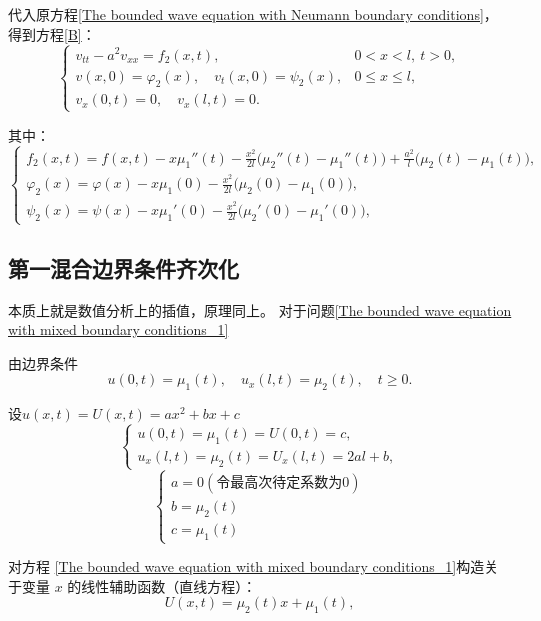 \documentclass[12pt,a4paper]{article}
\numberwithin{subsection}{section}
\numberwithin{subsubsection}{subsection}
\theoremstyle{plain}
\theoremstyle{definition}
\theoremstyle{remark}
\begin{document}
		代入原方程\eqref{The bounded wave equation with Neumann boundary conditions}，
		得到方程\eqref{B}：
	    \begin{equation}\label{B}
		\begin{cases}
			v_{tt} - a^2 v_{xx} = f_2(x, t), & 0 < x < l, \ t > 0, \\
			v(x, 0) = \varphi_2(x), \quad v_t(x, 0) = \psi_2(x), & 0 \leq x \leq l, \\
			v_x(0, t) = 0, \quad v_x(l, t) = 0. &
		\end{cases}
	\end{equation}

其中：
		\begin{equation}
			\begin{cases}
				f_2(x, t) = f(x, t)-x\mu_1''(t) - \frac{x^2}{2l}\big( \mu_2''(t) - \mu_1''(t) \big) + \frac{a^2}{l}\big( \mu_2(t) - \mu_1(t) \big), \\
				\varphi_2(x) = \varphi(x) - x\mu_1(0) - \frac{x^2}{2l}\big( \mu_2(0) - \mu_1(0) \big), \\
			\psi_2(x) = \psi(x) - x\mu_1'(0) - \frac{x^2}{2l}\big( \mu_2'(0) - \mu_1'(0) \big), 
			\end{cases}
		\end{equation}
		
	
		
	\subsection{第一混合边界条件齐次化}
	本质上就是数值分析上的插值，原理同上。
	对于问题\eqref{The bounded wave equation with mixed boundary conditions_1}
	
		由边界条件
	\begin{equation}
		u(0,t) = \mu_1(t), \quad u_x(l,t) = \mu_2(t), \quad t \geq 0.
	\end{equation}
	
	设$u(x, t)=U(x, t)=ax^2+bx+c$
	\[
	\begin{cases}
		u(0, t) = \mu_1(t) = U(0, t) = c, \\
		u_x(l, t) = \mu_2(t) = U_x(l, t) = 2al + b,
	\end{cases}
	\]
	\[
	\begin{cases}
		a = 0 (\text{令最高次待定系数为0})\\
		b =\mu_2(t) \\
		c = \mu_1(t)
	\end{cases}
	\]
	
	对方程 \eqref{The bounded wave equation with mixed boundary conditions_1}构造关于变量 \(x\) 的线性辅助函数（直线方程）：
	\begin{equation}
		U(x, t) =  \mu_2(t) x+\mu_1(t) ,
	\end{equation}
	
\end{document}
